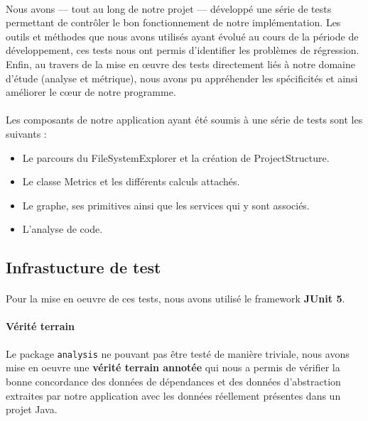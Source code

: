 \documentclass{scrartcl}
\begin{document}
    \paragraph{}Nous avons — tout au long de notre projet — développé une série de tests permettant de contrôler le bon fonctionnement de notre implémentation. Les outils et méthodes que nous avons utilisés ayant évolué au cours de la période de développement, ces tests nous ont permis d'identifier les problèmes de régression. Enfin, au travers de la mise en œuvre des tests directement liés à notre domaine d’étude (analyse et métrique), nous avons pu appréhender les spécificités et ainsi améliorer le cœur de notre programme.
    
    \paragraph{}Les composants de notre application ayant été soumis à une série de tests sont les suivants : 
    \begin{itemize}
    	\item Le parcours du FileSystemExplorer et la création de ProjectStructure.
    	\item Le classe Metrics et les différents calculs attachés.
    	\item Le graphe, ses primitives ainsi que les services qui y sont associés.
    	\item L’analyse de code.
    \end{itemize}

\subsection{Infrastucture de test}

    \paragraph{}Pour la mise en oeuvre de ces tests, nous avons utilisé le framework \textbf{JUnit 5}.
    
    \paragraph{Vérité terrain}Le package \texttt{analysis} ne pouvant pas être testé de manière triviale, nous avons mise en oeuvre une \textbf{vérité terrain annotée} qui nous a permis de vérifier la bonne concordance des données de dépendances et des données d’abstraction extraites par notre application avec les données réellement présentes dans un projet Java.
    
\end{document}
